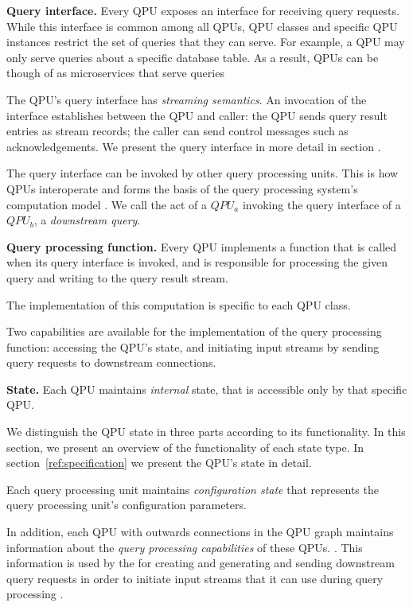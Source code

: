 \medskip
\noindent
\textbf{Query interface.}
Every QPU exposes an interface for receiving query requests.
While this interface is common among all QPUs, QPU classes and specific QPU instances restrict the set of queries
that they can serve.
For example, a QPU may only serve queries about a specific database table.
As a result, QPUs can be though of as microservices that serve queries

The QPU's query interface has \textit{streaming semantics}.
An invocation of the interface establishes between the QPU and caller:
the QPU sends query result entries as stream records; the caller can send control messages such as acknowledgements.
We present the query interface in more detail in section .

The query interface can be invoked by other query processing units.
This is how QPUs interoperate and forms the basis of the query processing system's computation model .
We call the act of a $QPU_a$ invoking the query interface of a $QPU_b$, a \textit{downstream query}.

\medskip
\noindent
\textbf{Query processing function.}
Every QPU implements a function that is called when its query interface is invoked, and is responsible for processing
the given query and writing to the query result stream.

The implementation of this computation is specific to each QPU class.

Two capabilities are available for the implementation of the query processing function:
accessing the QPU's state, and initiating input streams by sending query requests to downstream connections.

\medskip
\noindent
\textbf{State.}
Each QPU maintains \textit{internal} state, that is accessible only by that specific QPU.

We distinguish the QPU state in three parts according to its functionality.
In this section, we present an overview of the functionality of each state type.
In section~\ref{ref:specification} we present the QPU's state in detail.

Each query processing unit maintains \textit{configuration state} that represents the query processing unit's
configuration parameters.

In addition, each QPU with outwards connections in the QPU graph maintains information about the
\textit{query processing capabilities} of these QPUs. .
This information is used by the for creating and generating and sending downstream query requests in order to initiate
input streams that it can use during query processing .


